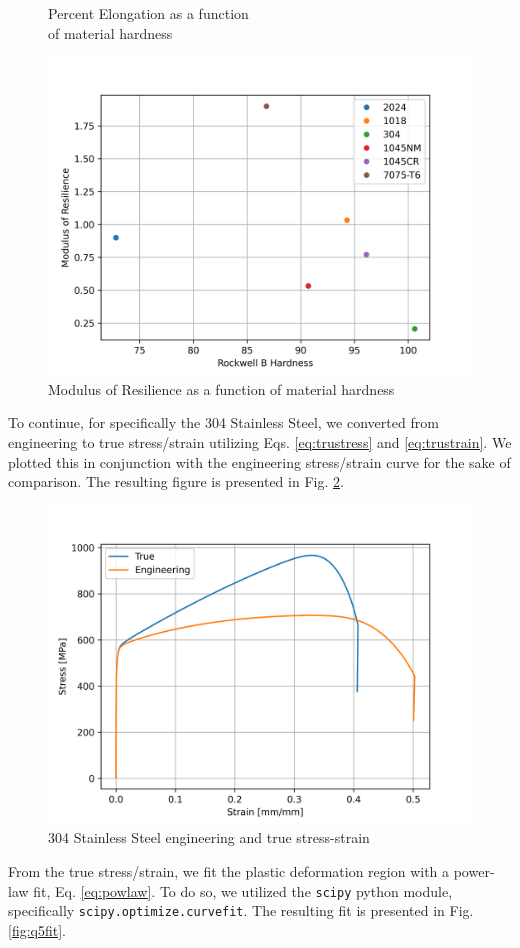 \documentclass{article}
\begin{document}
\begin{figure}[!h!]
\begin{minipage}[b]{0.5\linewidth}
    \caption{Percent Elongation as a function \\ of material hardness} 
    \vspace{4ex}
  \end{minipage} 
  \begin{minipage}[b]{\linewidth}
      \centering
      \includegraphics[width = .5\linewidth]{plots/q3_resilmod.png}
      \caption{Modulus of Resilience as a function of material hardness}
      \label{fig:q3resimod}
  \end{minipage}
\end{figure}
\newpage

To continue, for specifically the 304 Stainless Steel, we converted from engineering to true stress/strain utilizing Eqs. \ref{eq:trustress} and \ref{eq:trustrain}. We plotted this in conjunction with the engineering stress/strain curve for the sake of comparison. The resulting figure is presented in Fig. \ref{fig:q4evt}.
\begin{figure}[!h]
    \centering
    \includegraphics[width=0.5\linewidth]{plots/q4_evt.png}
    \caption{304 Stainless Steel engineering and true stress-strain}
    \label{fig:q4evt}
\end{figure}

From the true stress/strain, we fit the plastic deformation region with a power-law fit, Eq. \ref{eq:powlaw}. To do so, we utilized the \texttt{scipy} python module, specifically \texttt{scipy.optimize.curve\textunderscore fit}. The resulting fit is presented in Fig. \ref{fig:q5fit}. 
\end{document}
